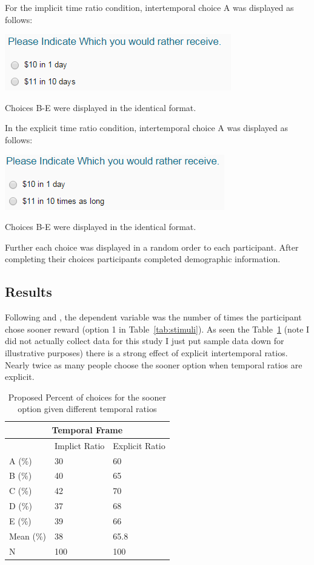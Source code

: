 \documentclass[]{article}
\begin{document}
For the implicit time ratio condition, intertemporal choice A was displayed as follows: 

\includegraphics[]{study1_implicit}

Choices B-E were displayed in the identical format. 

In the explicit time ratio condition, intertemporal choice A was displayed as follows:

\includegraphics[]{study1_explicit}

Choices B-E were displayed in the identical format. 

Further each choice was displayed in a random order to each participant. 
After completing their choices participants completed demographic information.

\subsection{Results}

Following  and , the dependent variable was the number of times the participant chose sooner reward (option 1 in Table~\ref{tab:stimuli}). 
As seen the Table~\ref{tab:study1results} (note I did not actually collect data for this study I just put sample data down for illustrative purposes) there is a strong effect of explicit intertemporal ratios. 
Nearly twice as many people choose the sooner option when temporal ratios are explicit.




\begin{table}[!ht]
	\caption{Proposed Percent of choices for the sooner option given different temporal ratios} 
	\label{tab:study1results}
\begin{tabular}{ p{3cm}||p{3cm}|p{3cm}  }
	\multicolumn{3}{|c|}{Temporal Frame} \\
	\hline
	 & Implict Ratio & Explicit Ratio\\
	\hline
	A (\%)	 & 30  & 60\\
	B (\%) 	 & 40  & 65   \\
	C (\%) 	 & 42  & 70\\
	D (\%)   & 37  & 68\\
	E (\%)   & 39  & 66\\
	Mean (\%) & 38  & 65.8 \\
	N  	 & 100  & 100\\
	\hline
	
\end{tabular}
\end{table}
\end{document}
